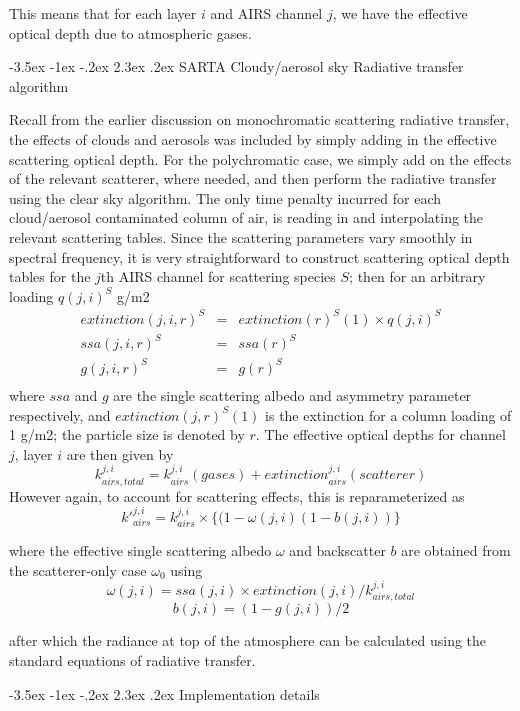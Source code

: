 \documentclass[11pt]{article}
\makeatletter
\renewcommand{\section}{\@startsection {section}{1}{\z@}%
                                   {-3.5ex \@plus -1ex \@minus -.2ex}%
                                   {2.3ex \@plus.2ex}%
                                   {\reset@font\large\bfseries}}
\makeatother
\begin{document}
This means that for each layer $i$ and AIRS channel $j$, we have the effective optical depth due to atmospheric gases. 

\section{SARTA Cloudy/aerosol sky Radiative transfer algorithm}

Recall from the earlier discussion on monochromatic scattering radiative transfer, the effects of clouds and 
aerosols was included by simply 
adding in the effective scattering optical depth. For the polychromatic case, we simply add on the effects of the 
relevant scatterer, where needed, and then perform the radiative transfer using the clear sky algorithm. The only time 
penalty incurred for each cloud/aerosol contaminated column of air, is reading in and interpolating the relevant 
scattering tables. Since the scattering parameters vary smoothly in spectral frequency, it is very straightforward to 
construct scattering optical depth tables for the $j$th AIRS channel for scattering species $S$; then for an arbitrary 
loading $q(j,i)^{S}$ g/m2
 \begin{eqnarray*}
  extinction(j,i,r)^{S} & = &  extinction(r)^{S}(1) \times  q(j,i)^{S} \\
  ssa(j,i,r)^{S} & = &  ssa(r)^{S} \\
  g(j,i,r)^{S} & = &  g(r)^{S} \\
\end{eqnarray*}
where $ssa$ and $g$ are the single scattering albedo and asymmetry parameter respectively, and $extinction(j,r)^{S}(1)$ 
is the extinction for a column loading of 1 g/m2; the particle size is denoted by $r$. The effective optical depths for 
channel $j$, layer $i$ are then given by
\[
   k_{airs,total}^{j,i} = k_{airs}^{j,i}(gases) + extinction_{airs}^{j,i}(scatterer)
\]
However again, to account for scattering effects, this is reparameterized as
\[
k\prime_{airs}^{j,i} = k_{airs}^{j,i} \times \{ (1-\omega(j,i) (1-b(j,i)) \}
\]

where the effective single scattering albedo $\omega$ and backscatter $b$ are
obtained from the scatterer-only case $\omega_{0}$ using
\[
\omega(j,i) = ssa(j,i) \times extinction(j,i)/k_{airs,total}^{j,i}
\]
\[
b(j,i)      = (1 - g(j,i))/2
\]

after which the radiance at top of the atmosphere can be calculated using the standard equations of radiative transfer.

\section{Implementation details}
\end{document}

